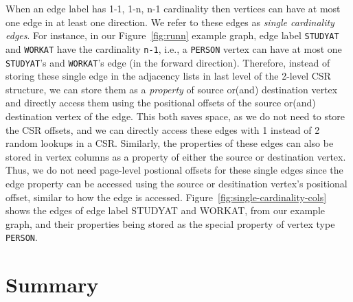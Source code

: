 When an edge label has 1-1, 1-n, n-1 cardinality then vertices can have at most one edge in at least one direction. We refer to these edges as {\em single cardinality edges}. For instance, in our Figure~\ref{fig:runn} example graph, edge label \texttt{STUDYAT} and \texttt{WORKAT} have the cardinality \texttt{n-1}, i.e., a \texttt{PERSON} vertex can have at most one \texttt{STUDYAT}'s and \texttt{WORKAT}'s edge (in the forward direction). Therefore, instead of storing these single edge in the adjacency lists in last level of the 2-level CSR structure, we can store them as a \emph{property} of source or(and) destination vertex and directly access them using the positional offsets of the source or(and) destination vertex of the edge. This both saves space, as we do not need to store the CSR offsets, and we can directly access these edges with 1 instead of 2 random lookups in a CSR. Similarly, the properties of these edges can also be stored in vertex columns as a property of either the source or destination vertex. Thus, we do not need page-level postional offsets for these single edges since the edge property can be accessed using the source or desitination vertex's positional offset, similar to how the edge is accessed. Figure~\ref{fig:single-cardinality-cols} shows the edges of edge label STUDYAT and WORKAT, from our example graph, and their properties being stored as the special property of vertex type \texttt{PERSON}.



\section{Summary}

